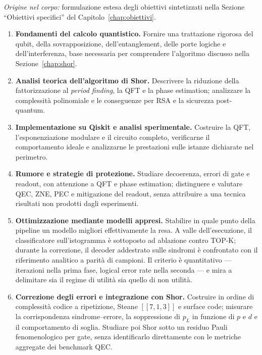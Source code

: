 \begin{onehalfspace}
\noindent\textit{Origine nel corpo:} formulazione estesa degli obiettivi sintetizzati nella Sezione ``Obiettivi specifici'' del Capitolo~\ref{chap:obiettivi}.

\begin{enumerate}
    \item \textbf{Fondamenti del calcolo quantistico.} Fornire una trattazione rigorosa del qubit, della sovrapposizione, dell'entanglement, delle porte logiche e dell'interferenza, base necessaria per comprendere l'algoritmo discusso nella Sezione~\ref{chap:shor}.

    \item \textbf{Analisi teorica dell'algoritmo di Shor.} Descrivere la riduzione della fattorizzazione al \textit{period finding}, la \ac{QFT} e la phase estimation; analizzare la complessità polinomiale e le conseguenze per \ac{RSA} e la sicurezza post-quantum.

    \item \textbf{Implementazione su Qiskit e analisi sperimentale.} Costruire la \ac{QFT}, l'esponenziazione modulare e il circuito completo, verificarne il comportamento ideale e analizzarne le prestazioni sulle istanze dichiarate nel perimetro.

    \item \textbf{Rumore e strategie di protezione.} Studiare decoerenza, errori di gate e readout, con attenzione a \ac{QFT} e phase estimation; distinguere e valutare \ac{QEC}, \ac{ZNE}, \ac{PEC} e mitigazione del readout, senza attribuire a una tecnica risultati non prodotti dagli esperimenti.

    \item \textbf{Ottimizzazione mediante modelli appresi.} Stabilire in quale punto della pipeline un modello migliori effettivamente la resa. A valle dell'esecuzione, il classificatore sull'istogramma è sottoposto ad ablazione contro TOP-K; durante la correzione, il decoder addestrato sulle sindromi è confrontato con il riferimento analitico a parità di campioni. Il criterio è quantitativo --- iterazioni nella prima fase, logical error rate nella seconda --- e mira a delimitare sia il regime di utilità sia quello di non utilità.

    \item \textbf{Correzione degli errori e integrazione con Shor.} Costruire in ordine di complessità codice a ripetizione, Steane $[[7,1,3]]$ e surface code; misurare la corrispondenza sindrome--errore, la soppressione di $p_L$ in funzione di $p$ e $d$ e il comportamento di soglia. Studiare poi Shor sotto un residuo Pauli fenomenologico per gate, senza identificarlo direttamente con le metriche aggregate dei benchmark QEC.
\end{enumerate}


\end{onehalfspace}
